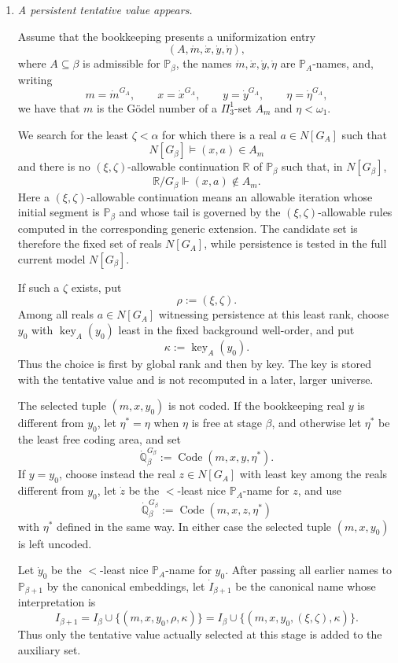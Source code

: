 \documentclass[a4paper,11pt]{article}
\newcommand{\forceP}{\mathbb{P}}
\newcommand{\forceQ}{\mathbb{Q}}
\newcommand{\forceR}{\mathbb{R}}
\begin{document}
\begin{enumerate}
\item[(a)] \emph{A persistent tentative value appears.}

Assume that the bookkeeping presents a uniformization entry
\[
(A,\dot m,\dot x,\dot y,\dot\eta),
\]
where $A\subseteq\beta$ is admissible for $\forceP_\beta$, the names $\dot m,\dot x,\dot y,\dot\eta$ are $\forceP_A$-names, and, writing
\[
m=\dot m^{G_A},\qquad
x=\dot x^{G_A},\qquad
y=\dot y^{G_A},\qquad
\eta=\dot\eta^{G_A},
\]
we have that $m$ is the G\"odel number of a $\Pi^1_3$-set $A_m$ and $\eta<\omega_1$.

We search for the least $\zeta<\alpha$ for which there is a real $a\in N[G_A]$ such that
\[
N[G_\beta]\models (x,a)\in A_m
\]
and there is no $(\xi,\zeta)$-allowable continuation $\forceR$ of $\forceP_\beta$ such that, in $N[G_\beta]$,
\[
\forceR/G_\beta\Vdash (x,a)\notin A_m.
\]
Here a $(\xi,\zeta)$-allowable continuation means an allowable iteration whose initial segment is $\forceP_\beta$ and whose tail is governed by the $(\xi,\zeta)$-allowable rules computed in the corresponding generic extension. The candidate set is therefore the fixed set of reals $N[G_A]$, while persistence is tested in the full current model $N[G_\beta]$.

If such a $\zeta$ exists, put
\[
\rho:=(\xi,\zeta).
\]
Among all reals $a\in N[G_A]$ witnessing persistence at this least rank, choose $y_0$ with $\operatorname{key}_A(y_0)$ least in the fixed background well-order, and put
\[
\kappa:=\operatorname{key}_A(y_0).
\]
Thus the choice is first by global rank and then by key. The key is stored with the tentative value and is not recomputed in a later, larger universe.

The selected tuple $(m,x,y_0)$ is not coded. If the bookkeeping real $y$ is different from $y_0$, let $\eta^*=\eta$ when $\eta$ is free at stage $\beta$, and otherwise let $\eta^*$ be the least free coding area, and set
\[
\dot{\forceQ}_\beta^{G_\beta}
:=\operatorname{Code}(m,x,y,\eta^*).
\]
If $y=y_0$, choose instead the real $z\in N[G_A]$ with least key among the reals different from $y_0$, let $\dot z$ be the $<$-least nice $\forceP_A$-name for $z$, and use
\[
\dot{\forceQ}_\beta^{G_\beta}
:=\operatorname{Code}(m,x,z,\eta^*)
\]
with $\eta^*$ defined in the same way. In either case the selected tuple $(m,x,y_0)$ is left uncoded.

Let $\dot y_0$ be the $<$-least nice $\forceP_A$-name for $y_0$. After passing all earlier names to $\forceP_{\beta+1}$ by the canonical embeddings, let $\dot I_{\beta+1}$ be the canonical name whose interpretation is
\[
I_{\beta+1}
=I_\beta\cup\{(m,x,y_0,\rho,\kappa)\}
=I_\beta\cup\{(m,x,y_0,(\xi,\zeta),\kappa)\}.
\]
Thus only the tentative value actually selected at this stage is added to the auxiliary set.


\end{enumerate}
\end{document}
